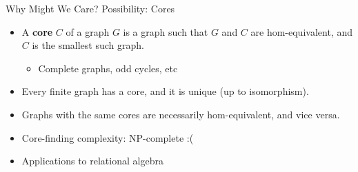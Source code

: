\documentclass{beamer}
\begin{document}
\begin{frame}{Why Might We Care? Possibility: Cores}
  \begin{itemize}
    \item A \textbf{core} $C$ of a graph $G$ is a graph such that $G$ and $C$ are hom-equivalent, and $C$ is the smallest such graph.
    \begin{itemize}
      \item Complete graphs, odd cycles, etc
    \end{itemize}
    \item Every finite graph has a core, and it is unique (up to isomorphism).
    \item Graphs with the same cores are necessarily hom-equivalent, and vice versa.
    \item Core-finding complexity: NP-complete :(
    \item Applications to relational algebra
  \end{itemize}
\end{frame}
\end{document}

